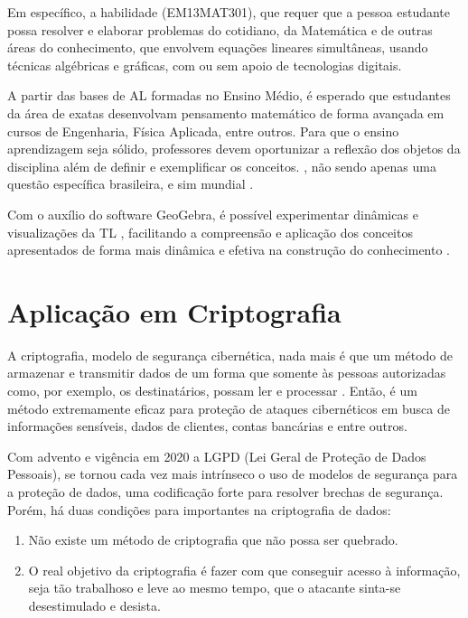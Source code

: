 Em específico, a habilidade (EM13MAT301), que requer que a pessoa estudante possa resolver e elaborar problemas do cotidiano, da Matemática e de outras áreas do conhecimento, que envolvem equações lineares simultâneas, usando técnicas algébricas e gráficas, com ou sem apoio de tecnologias digitais.

A partir das bases de AL formadas no Ensino Médio, é esperado que estudantes da área de exatas desenvolvam pensamento matemático de forma avançada em cursos de Engenharia, Física Aplicada, entre outros. Para que o ensino aprendizagem seja sólido, professores devem oportunizar a reflexão dos objetos da disciplina além de definir e exemplificar os conceitos. \cite{marins_savioli_2016}, não sendo apenas uma questão específica brasileira, e sim mundial \cite{pena2016}.

Com o auxílio do software GeoGebra, é possível experimentar dinâmicas e visualizações da TL \cite{eliza2015}, facilitando a compreensão e aplicação dos conceitos apresentados de forma mais dinâmica e efetiva na construção do conhecimento \cite{souzasilzaeliza2017}.

\section{Aplicação em Criptografia}
A criptografia, modelo de segurança cibernética, nada mais é que um método de armazenar e transmitir dados de um forma que somente às pessoas autorizadas como, por exemplo, os destinatários, possam ler e processar \cite{helio2009}. Então, é um método extremamente eficaz para proteção de ataques cibernéticos em busca de informações sensíveis, dados de clientes, contas bancárias e entre outros.

Com advento e vigência em 2020 a LGPD (Lei Geral de Proteção de Dados Pessoais), se tornou cada vez mais intrínseco o uso de modelos de segurança para a proteção de dados, uma codificação forte para resolver brechas de segurança. Porém, há duas condições para importantes na criptografia de dados:

\begin{enumerate}
	\item Não existe um método de criptografia que não possa ser quebrado.
	\item O real objetivo da criptografia é fazer com que conseguir acesso à informação, seja tão trabalhoso e leve ao mesmo tempo, que o atacante sinta-se desestimulado e desista.
\end{enumerate}

